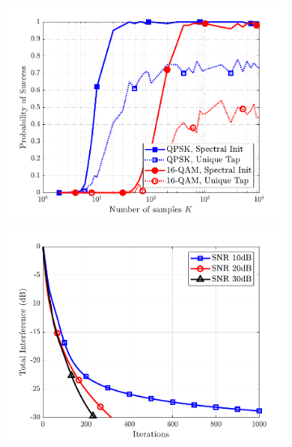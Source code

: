 \begin{figure}
\centering
\begin{subfigure}[t]{0.32\textwidth}
	\includegraphics[width=\linewidth]{./figs/wfcma_figs/BF_WF_sucess_allmods_L=4_M=8_T=1000_mu=5e-4.pdf}	
\label{wfcma:fig:wf_ssr_success}
\end{subfigure}\hfill
\begin{subfigure}[t]{0.32\textwidth}
\includegraphics[width=\linewidth]{./figs/wfcma_figs/BF_WF_TI_4QAM_L=4_M=8_K=400_2.pdf}	
\label{wfcma:fig:wf_ssr_4qam_M8L4}

\end{subfigure}
\end{figure}
